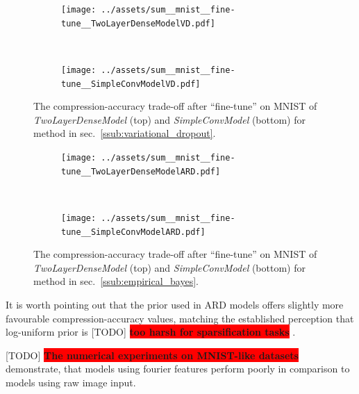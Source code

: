\documentclass[a4paper,10pt]{article}
\newcommand{\important}[1]{\textbf{\!\colorbox{red}{#1}\!}}
\newcommand{\todo}[1]{{\color{blue} [TODO]} \important{#1}}
\begin{document}
\begin{figure}[!ht]
  \centering
  \begin{subfigure}[b]{0.95\textwidth}  %
    \centering
    \texttt{[image: ../assets/sum\_\_mnist\_\_fine-tune\_\_TwoLayerDenseModelVD.pdf]}
  \end{subfigure} \\%
  \begin{subfigure}[b]{0.95\textwidth}  %
    \centering
    \texttt{[image: ../assets/sum\_\_mnist\_\_fine-tune\_\_SimpleConvModelVD.pdf]}
  \end{subfigure}
  \caption{%
    The compression-accuracy trade-off after ``fine-tune'' on MNIST of \textit{TwoLayerDenseModel}
    (top) and \textit{SimpleConvModel} (bottom) for method in sec.~\ref{ssub:variational_dropout}.
  }
  \label{fig:mnist-like__trade-off__vd}
\end{figure}

\begin{figure}[!ht]
  \centering
  \begin{subfigure}[b]{0.95\textwidth}  %
    \centering
    \texttt{[image: ../assets/sum\_\_mnist\_\_fine-tune\_\_TwoLayerDenseModelARD.pdf]}
  \end{subfigure} \\%
  \begin{subfigure}[b]{0.95\textwidth}  %
    \centering
    \texttt{[image: ../assets/sum\_\_mnist\_\_fine-tune\_\_SimpleConvModelARD.pdf]}
  \end{subfigure}
  \caption{%
    The compression-accuracy trade-off after ``fine-tune'' on MNIST of \textit{TwoLayerDenseModel}
    (top) and \textit{SimpleConvModel} (bottom) for method in sec.~\ref{ssub:empirical_bayes}.
  }
  \label{fig:mnist-like__trade-off__ard}
\end{figure}

It is worth pointing out that the prior used in ARD models offers slightly more favourable
compression-accuracy values, matching the established perception that log-uniform prior
is \todo{too harsh for sparsification tasks} \citep{kharitonov_variational_2018}.

\todo{The numerical experiments on MNIST-like datasets} demonstrate, that models using fourier
features perform poorly in comparison to models using raw image input.
\end{document}
